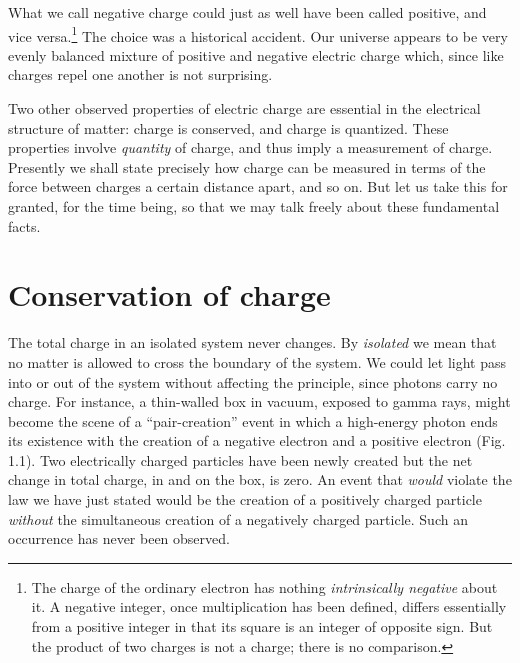 What we call negative charge could just as well have been
called positive, and vice versa.\footnote{The charge of the ordinary electron has nothing
\emph{intrinsically negative} about it. A negative integer, once multiplication has been
defined, differs essentially from a positive integer in that its square is an integer of
opposite sign. But the product of two charges is not a charge; there is no comparison.}
The choice was a historical accident. Our
universe appears to be very evenly balanced mixture of positive and negative
electric charge which, since like charges repel one another is not surprising. 

Two other observed properties of electric charge are
essential in the electrical structure of matter: charge is conserved, and
charge is quantized. These properties involve \emph{quantity} of charge, and
thus imply a measurement of charge. Presently we shall state precisely how
charge can be measured in terms of the force between charges a certain distance
apart, and so on. But let us take this for granted, for the time being, so that
we may talk freely about these fundamental facts. 

\section{Conservation of charge}

The total charge in an isolated system never changes. By
\emph{isolated} we mean that no matter is allowed to cross the boundary of the
system. We could let light pass into or out of the system without affecting the
principle, since photons carry no charge. For instance, a thin-walled box in
vacuum, exposed to gamma rays, might become the scene of a ``pair-creation''
event in which a high-energy photon ends its existence with the creation of a
negative electron and a positive electron (Fig. 1.1). Two electrically charged
particles have been newly created but the net change in total charge, in and on
the box, is zero. An event that \emph{would} violate the law we have just
stated would be the creation of a positively charged particle \emph{without}
the simultaneous creation of a negatively charged particle. Such an occurrence
has never been observed. 

